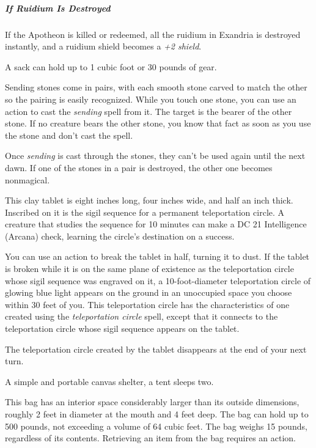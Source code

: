 \documentclass[10pt,a4paper,twoside,fancy,bg=print,twocolumn,openany,nodeprecatedcode]{dndbook}
\begin{document}
\subparagraph{If Ruidium Is Destroyed}
If the Apotheon is killed or redeemed, all the ruidium in Exandria is destroyed instantly, and a ruidium shield becomes a \textit{+2 shield}.

A sack can hold up to 1 cubic foot or 30 pounds of gear.

Sending stones come in pairs, with each smooth stone carved to match the other so the pairing is easily recognized. While you touch one stone, you can use an action to cast the \textit{sending} spell from it. The target is the bearer of the other stone. If no creature bears the other stone, you know that fact as soon as you use the stone and don't cast the spell.

Once \textit{sending} is cast through the stones, they can't be used again until the next dawn. If one of the stones in a pair is destroyed, the other one becomes nonmagical.

This clay tablet is eight inches long, four inches wide, and half an inch thick. Inscribed on it is the sigil sequence for a permanent teleportation circle. A creature that studies the sequence for 10 minutes can make a DC 21 Intelligence (Arcana) check, learning the circle's destination on a success.

You can use an action to break the tablet in half, turning it to dust. If the tablet is broken while it is on the same plane of existence as the teleportation circle whose sigil sequence was engraved on it, a 10-foot-diameter teleportation circle of glowing blue light appears on the ground in an unoccupied space you choose within 30 feet of you. This teleportation circle has the characteristics of one created using the \textit{teleportation circle} spell, except that it connects to the teleportation circle whose sigil sequence appears on the tablet.

The teleportation circle created by the tablet disappears at the end of your next turn.

A simple and portable canvas shelter, a tent sleeps two.

This bag has an interior space considerably larger than its outside dimensions, roughly 2 feet in diameter at the mouth and 4 feet deep. The bag can hold up to 500 pounds, not exceeding a volume of 64 cubic feet. The bag weighs 15 pounds, regardless of its contents. Retrieving an item from the bag requires an action.
\end{document}
